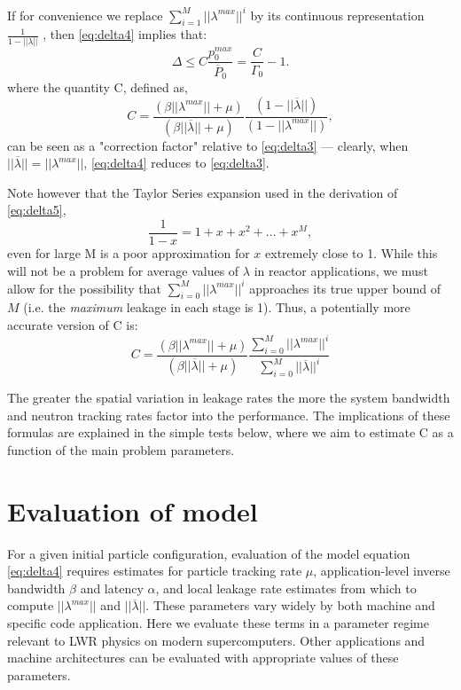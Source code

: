 If for convenience we replace $\sum_{i=1}^M ||\lambda^{max}||^i$ by its
continuous representation $\frac{1}{1-||\lambda||}$ , then \eqref{eq:delta4}
implies that:
\begin{equation}
  \label{eq:delta5}
  \Delta \le C \frac{p_0^{max}}{\overline{P}_0} = \frac{C}{\Gamma_0} - 1.
\end{equation}
where the quantity C, defined as,
\begin{equation*}
  C = \frac{(\beta ||\lambda^{max}|| + \mu)}{(\beta ||\overline{\lambda}|| +
    \mu)} \frac{(1 - ||\overline{\lambda}||)}{(1-||\lambda^{max}||)},
\end{equation*}
can be seen as a "correction factor" relative to \eqref{eq:delta3} --- clearly,
when $||\overline{\lambda}|| = ||\lambda^{max}||$, \eqref{eq:delta4} reduces to
\eqref{eq:delta3}.

Note however that the Taylor Series expansion used in the derivation of
\eqref{eq:delta5},
\begin{equation*}
  \frac{1}{1-x} = 1 + x + x^2 + \dots + x^M,
\end{equation*}
even for large M is a poor approximation for $x$ extremely close to 1. While
this will not be a problem for average values of $\lambda$ in reactor
applications, we must allow for the possibility that $\sum_{i=0}^M
||\lambda^{max}||^i$ approaches its true upper bound of $M$ (i.e. the
\emph{maximum} leakage in each stage is 1). Thus, a potentially more accurate
version of C is:
\begin{equation*}
  C = \frac{(\beta ||\lambda^{max}|| + \mu)}{(\beta ||\overline{\lambda}|| +
    \mu)} \frac{\sum_{i=0}^M ||{\lambda^{max}}||^i}{\sum_{i=0}^M
    ||\overline{\lambda}||^i}
\end{equation*}

The greater the spatial variation in leakage rates the more the system bandwidth
and neutron tracking rates factor into the performance. The implications of
these formulas are explained in the simple tests below, where we aim to estimate
C as a function of the main problem parameters.

\section{Evaluation of model}

For a given initial particle configuration, evaluation of the model equation
\eqref{eq:delta4} requires estimates for particle tracking rate $\mu$,
application-level inverse bandwidth $\beta$ and latency $\alpha$, and local
leakage rate estimates from which to compute $||\lambda^{max}||$ and
$||\overline{\lambda}||$. These parameters vary widely by both machine and
specific code application. Here we evaluate these terms in a parameter regime
relevant to LWR physics on modern supercomputers. Other applications and machine
architectures can be evaluated with appropriate values of these parameters.

